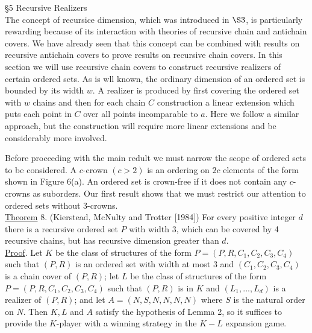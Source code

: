 \documentclass[twoside]{article}
\begin{document}
\noindent\S 5 Recursive Realizers\\


The concept of recursice dimension, which was introduced in $\S 3$, is particularly
rewarding because of its interaction with theories of recursive chain and antichain covers.
We have already seen that this concept can be combined with results on recursive antichain covers to prove results
on recursive chain covers. In this section we will use recursive chain covers to construct
recursive realizers of certain ordered sets. As is wll known, the ordinary dimension
of an ordered set is bounded by its width $w$. A realizer is produced by first covering the ordered set with 
$w$ chains and then for each chain $C$ construction a linear extension which puts each point in 
$C$ over all points incomparable to $a$. Here we follow a similar approach, but the construction
will require more linear extensions and be considerably more involved.

%
%
Before proceeding with the main redult we must narrow the scope of ordered
sets to be considered. A $c$-crown $(c>2)$ is an ordering on $2c$ elements
of the form shown in Figure 6(a). An ordered set is crown-free
if it does not contain any $c$-crowns as suborders. Our first result shows that we must restrict our
attention to ordered sets without 3-crowns.\\
\newline
\underline{Theorem} 8. (Kierstead, McNulty and Trotter [1984]) For every positive integer $d$ there is a 
recursive ordered set $P$ with width 3, which can be covered by 4 recursive chains,
but has recursive dimension greater than $d$.\\
\newline
\underline{Proof}. Let $K$ be the class of structures of the form
$P=(P,R,C_1,C_2,C_3,C_4)$ such that $(P,R)$ is an ordered set with width at most 3 and 
$(C_1,C_2,C_3,C_4)$ is a chain cover of $(P,R)$; let $L$ be the class of structures
of the form $P=(P,R,C_1,C_2,C_3,C_4)$ such that $(P,R)$ is in $K$ and
$(L_1,...,L_d)$ is a realizer of $(P,R)$; and let $A=(N,S,N,N,N,N)$ where
$S$ is the natural order on $N$. Then $K,L$ and $A$ satisfy the hypothesis 
of Lemma 2, so it suffices to provide the $K$-player with a winning strategy
in the $K-L$ expansion game.
\end{document}
